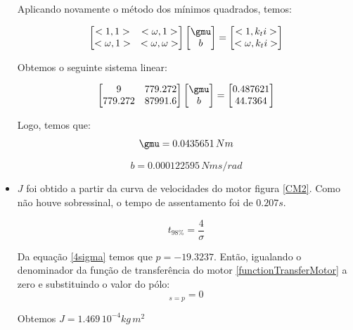 \documentclass[]{politex}
\begin{document}
\begin{itemize}
Aplicando novamente o método dos mínimos quadrados, temos:

\begin{equation}
\begin{bmatrix}
<1, 1> & <\omega, 1>\\
<\omega, 1> & <\omega, \omega>
\end{bmatrix}
\begin{bmatrix}
\gmu\\
b
\end{bmatrix}= 
\begin{bmatrix}
<1, k_{t} i >\\
<\omega, k_{t} i >
\end{bmatrix}
\end{equation}

Obtemos o seguinte sistema linear:

\begin{equation}
\begin{bmatrix}
9 & 779.272\\
779.272 & 87991.6
\end{bmatrix}
\begin{bmatrix}
\gmu\\
b
\end{bmatrix}= 
\begin{bmatrix}
0.487621\\
44.7364
\end{bmatrix}
\end{equation}

Logo, temos que: 
\begin{equation}
\gmu = 0.0435651 \, Nm
\end{equation}

\begin{equation}
b = 0.000122595 \, Nm s/rad
\end{equation}

\item $J$ foi obtido a partir da curva de velocidades do motor figura \ref{CM2}. Como não houve sobressinal, o tempo de assentamento foi de $0.207 s$.

\begin{equation}
\label{4sigma}
 t_{98\%} =\frac{4}{\sigma}
\end{equation}

Da equação \eqref{4sigma} temos que $p= -19.3237$.
Então, igualando o denominador da função de transferência do motor \eqref{functionTransferMotor}  a zero e substituindo o valor do pólo:
\begin{equation}
[(L s + R) (J s + b) + k_t k_e]_{s = p} = 0
\end{equation}

Obtemos $J = 1.469 \, 10^{-4} kg \, m^2 $

\end{itemize}
\end{document}
